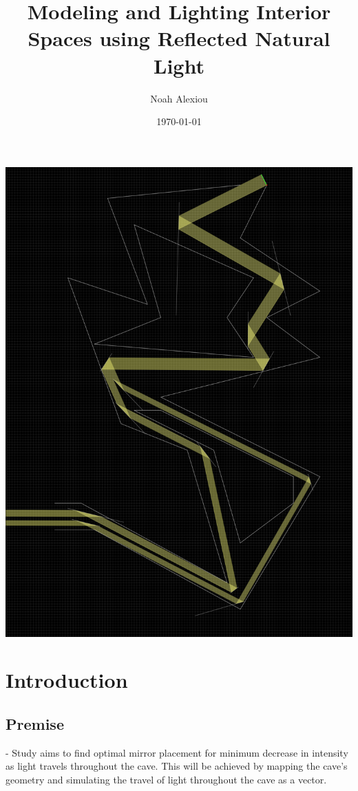 \documentclass[11pt, letterpaper]{article}
\begin{document}
\begin{titlepage}
	\title{Modeling and Lighting Interior Spaces using Reflected Natural Light}
	\author{Noah Alexiou}
	\date{\today}
	
	\maketitle
	\centering
	\includegraphics[width=15cm]{Images/Cave.png}
	
\end{titlepage}

\newpage
\tableofcontents


\newpage

\section{Introduction}


\subsection{Premise}
- Study aims to find optimal mirror placement for minimum decrease in intensity as light travels throughout the cave. This will be achieved by mapping the cave's geometry and simulating the travel of light throughout the cave as a vector. 
\end{document}
